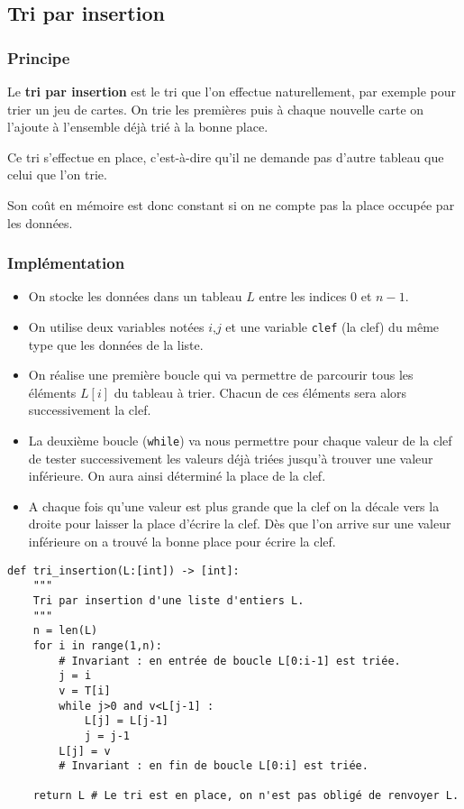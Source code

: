 \subsection{Tri par insertion}
\subsubsection{Principe}

\begin{defi}
Le \textbf{tri par insertion} est le tri que l'on effectue naturellement, par exemple pour trier un jeu de cartes. On trie les premières puis à chaque nouvelle carte on l'ajoute à l'ensemble déjà trié à la bonne place. 

Ce tri s'effectue en place, c'est-à-dire qu'il ne demande pas d'autre tableau que celui que l'on trie. 

Son coût en mémoire est donc constant si on ne compte pas la place occupée par les données.
\end{defi}



\subsubsection{Implémentation}


\begin{itemize}
\item On stocke les données dans un tableau $L$ entre les indices $0$ et $n-1$.
\item On utilise deux variables notées $i$,$j$ et une variable \texttt{clef} (la clef) du même type que les données de la liste.
\item On réalise une première boucle qui va permettre de parcourir tous les éléments $L[i]$ du tableau à trier.
Chacun de ces éléments sera alors successivement la clef.
\item La deuxième boucle (\texttt{while}) va nous permettre pour chaque valeur de la clef de tester successivement les valeurs déjà triées jusqu'à trouver une valeur inférieure. On aura ainsi déterminé la place de la clef.
\item A chaque fois qu'une valeur est plus grande que la clef on la décale vers la droite pour laisser la place d'écrire la clef.
Dès que l'on arrive sur une valeur inférieure on a trouvé la bonne place pour écrire la clef.
\end{itemize}


\begin{lstlisting}
def tri_insertion(L:[int]) -> [int]:
    """
    Tri par insertion d'une liste d'entiers L.
    """
    n = len(L)
    for i in range(1,n):
        # Invariant : en entrée de boucle L[0:i-1] est triée.
        j = i
        v = T[i]
        while j>0 and v<L[j-1] :
            L[j] = L[j-1]
            j = j-1
        L[j] = v
        # Invariant : en fin de boucle L[0:i] est triée.
	
    return L # Le tri est en place, on n'est pas obligé de renvoyer L. 
\end{lstlisting}    


